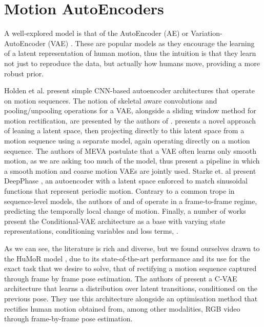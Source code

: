 \section{Motion AutoEncoders}

A well-explored model is that of the AutoEncoder (AE) \cite{bank2021_autoencoders} or Variation-AutoEncoder (VAE) \cite{kingma2022_VAE}. These are popular models as they encourage the learning of a latent representation \cite{bank2021_autoencoders} of human motion, thus the intuition is that they learn not just to reproduce the data, but actually how humans move, providing a more robust prior.


Holden et al. \cite{ConvAutoEnv2015} \cite{ConvAutoEnv2016} present simple CNN-based autoencoder architectures that operate on motion sequences. The notion of skeletal aware convolutions and pooling/unpooling operations for a VAE, alongside a sliding window method for motion rectification, are presented by the authors of \cite{HierarchicalMotionVAE}. \cite{TransformerVAEPrior} presents a novel approach of leaning a latent space, then projecting directly to this latent space from a motion sequence using a separate model, again operating directly on a motion sequence. The authors of MEVA \cite{MEVA} postulate that a VAE often learns only smooth motion, as we are asking too much of the model, thus present a pipeline in which a smooth motion and coarse motion VAEs are jointly used. Starke et. al present DeepPhase \cite{DeepPhase}, an autoencoder with a latent space enforced to match sinusoidal functions that represent periodic motion. Contrary to a common trope in sequence-level models, the authors of \cite{learnedInbetweening} and of \cite{MotionVAE} operate in a frame-to-frame regime, predicting the temporally local change of motion. Finally, a number of works present the Conditional-VAE architecture \cite{CVAE} as a base with varying state representations, conditioning variables and loss terms, \cite{humor, learnedInbetweening, MotionVAE, structured4Dlatentspace}.

As we can see, the literature is rich and diverse, but we found ourselves drawn to the HuMoR model \cite{humor}, due to its state-of-the-art performance and its use for the exact task that we desire to solve, that of rectifying a motion sequence captured through frame by frame pose estimation. The authors of \cite{humor} present a C-VAE architecture that learns a distribution over latent transitions, conditioned on the previous pose. They use this architecture alongside an optimisation method that rectifies human motion obtained from, among other modalities, RGB video through frame-by-frame pose estimation.

